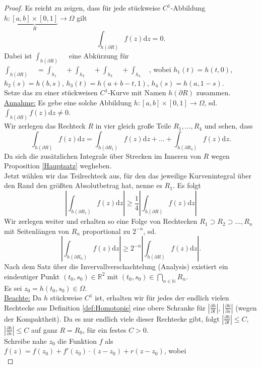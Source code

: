 \documentclass[11pt,titlepage]{article}
\theoremstyle{definition}
\theoremstyle{remark}
\begin{document}
	\begin{proof}
		Es reicht zu zeigen, dass für jede stückweise $C^1$-Abbildung $h:\underbrace{[a,b]\times [0,1]}_
		{R}\to\Omega$ gilt
		\[ \int_{h(\partial R)} f(z) \mathrm{d}z =0. \]
		Dabei ist $\int_{h(\partial R)}\quad$ eine Abkürzung für $\int_{h(\partial R)}\quad =
		\int_{h_1}\quad +\int_{h_2}\quad +\int_{h_3}\quad +\int_{h_4}\quad$, wobei 
		$h_1 (t)=h(t,0)$, $h_2 (s)=h(b,s)$, $h_3 (t)=h(a+b-t,1)$, $h_4 (s)=h(a,1-s)$. \\
		Setze das zu einer stückweisen $C^1$-Kurve mit Namen $h(\partial R)$ zusammen. \\
		\underline{Annahme:} Es gebe eine solche Abbildung $h:[a,b]\times [0,1]\to \Omega$, sd. 
		$\int_{h(\partial R)} f(z)\mathrm{d}z \neq 0$. \\
		Wir zerlegen das Rechteck $R$ in vier gleich große Teile $R_1 ,\ldots,R_4$ und sehen, dass
		\[ \int_{h(\partial R)} f(z)\mathrm{d}z = \int_{h(\partial R_1)} f(z)\mathrm{d}z +\ldots +
		\int_{h(\partial R_4)} f(z)\mathrm{d}z. \]
		Da sich die zusätzlichen Integrale über Strecken im Inneren von $R$ wegen Proposition 
		\ref{Hauptsatz} wegheben. \\
		Jetzt wählen wir das Teilrechteck aus, für den das jeweilige Kurvenintegral über den Rand den 
		größten Absolutbetrag hat, nenne es $R_1$. Es folgt 
		\[ \left| \int_{h(\partial R_1)}f(z)\mathrm{d}z\right| \geq \frac{1}{4} \left|\int_{h(\partial R)}f(z)
		\mathrm{d}z \right| \]
		Wir zerlegen weiter und erhalten so eine Folge von Rechtecken $R_1 \supset R_2 \supset\ldots 
		,R_n$ mit Seitenlängen von $R_n$ proportional zu $2^{-n}$, sd.
		\[ \left| \int_{h(\partial R_n)} f(z)\mathrm{d}z \right| \geq 2^{-n} \left| \int_{h(\partial R)}f(z)
		\mathrm{d}z \right|. \]
		Nach dem Satz über die Invervallverschachtelung (Analysis) existiert ein eindeutiger Punkt 
		$(t_0,s_0)\in\mathbb{R}^2$ mit $(t_0,s_0)\in  \bigcap_{n\in\mathbb{N}}R_n$. \\
		Es sei $z_0 =h(t_0,s_0)\in\Omega$.\\
		\underline{Beachte:} Da $h$ stückweise $C^1$ ist, erhalten wir für jedes der endlich vielen 
		Rechtecke aus Definition \ref{def:Homotopie} eine obere Schranke für 
		$|\frac{\partial h}{\partial t}|$, $|\frac{\partial h}{\partial s}|$ (wegen der Kompaktheit). 
		Da es nur endlich viele dieser Rechtecke gibt, folgt $|\frac{\partial h}{\partial t}|\leq C$, 
		$|\frac{\partial h}{\partial s}| \leq C$ auf ganz $R=R_0$, für ein festes $C>0$. \\
		Schreibe nahe $z_0$ die Funktion $f$ als $f(z)=f(z_0)+f'(z_0)\cdot (z-z_0)+r(z-z_0)$, wobei \\

\end{proof}
\end{document}
